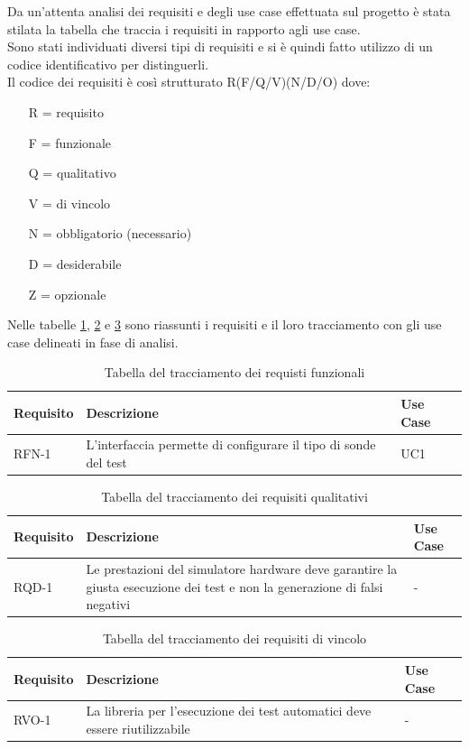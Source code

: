 Da un'attenta analisi dei requisiti e degli use case effettuata sul progetto è stata stilata la tabella che traccia i requisiti in rapporto agli use case.\\
Sono stati individuati diversi tipi di requisiti e si è quindi fatto utilizzo di un codice identificativo per distinguerli.\\
Il codice dei requisiti è così strutturato R(F/Q/V)(N/D/O) dove:
\begin{enumerate}
	\item[R =] requisito
    \item[F =] funzionale
    \item[Q =] qualitativo
    \item[V =] di vincolo
    \item[N =] obbligatorio (necessario)
    \item[D =] desiderabile
    \item[Z =] opzionale
\end{enumerate}
Nelle tabelle \ref{tab:requisiti-funzionali}, \ref{tab:requisiti-qualitativi} e \ref{tab:requisiti-vincolo} sono riassunti i requisiti e il loro tracciamento con gli use case delineati in fase di analisi.

\newpage

\begin{table}%
\caption{Tabella del tracciamento dei requisti funzionali}
\label{tab:requisiti-funzionali}
\begin{tabularx}{\textwidth}{lXl}
\hline\hline
\textbf{Requisito} & \textbf{Descrizione} & \textbf{Use Case}\\
\hline
RFN-1     & L'interfaccia permette di configurare il tipo di sonde del test & UC1 \\
\hline
\end{tabularx}
\end{table}%

\begin{table}%
\caption{Tabella del tracciamento dei requisiti qualitativi}
\label{tab:requisiti-qualitativi}
\begin{tabularx}{\textwidth}{lXl}
\hline\hline
\textbf{Requisito} & \textbf{Descrizione} & \textbf{Use Case}\\
\hline
RQD-1    & Le prestazioni del simulatore hardware deve garantire la giusta esecuzione dei test e non la generazione di falsi negativi & - \\
\hline
\end{tabularx}
\end{table}%

\begin{table}%
\caption{Tabella del tracciamento dei requisiti di vincolo}
\label{tab:requisiti-vincolo}
\begin{tabularx}{\textwidth}{lXl}
\hline\hline
\textbf{Requisito} & \textbf{Descrizione} & \textbf{Use Case}\\
\hline
RVO-1    & La libreria per l'esecuzione dei test automatici deve essere riutilizzabile & - \\
\hline
\end{tabularx}
\end{table}%